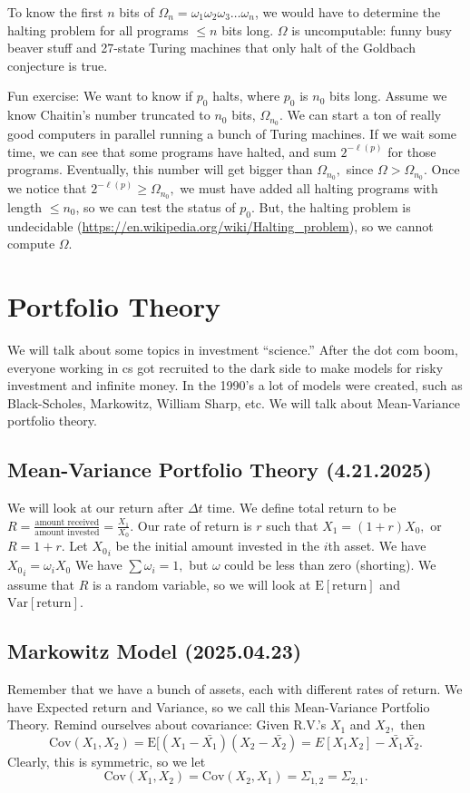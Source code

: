 \documentclass[12pt]{article}
\theoremstyle{remark}
\begin{document}
To know the first $n$ bits of $\Omega_n=\omega_1\omega_2\omega_3\dots\omega_n$, we would have to determine the halting problem for all programs $\le n$ bits long. $\Omega$ is uncomputable: funny busy beaver stuff and 27-state Turing machines that only halt of the Goldbach conjecture is true.

Fun exercise: We want to know if $p_0$ halts, where $p_0$ is $n_0$ bits long. Assume we know Chaitin's number truncated to $n_0$ bits, $\Omega_{n_0}.$ We can start a ton of really good computers in parallel running a bunch of Turing machines. If we wait some time, we can see that some programs have halted, and sum $2^{-\ell(p)}$ for those programs. Eventually, this number will get bigger than $\Omega_{n_0},$ since $\Omega > \Omega_{n_0}$. Once we notice that $2^{-\ell(p)}\ge\Omega_{n_0},$ we must have added all halting programs with length $\le n_0$, so we can test the status of $p_0.$ But, the halting problem is undecidable (\url{https://en.wikipedia.org/wiki/Halting_problem}), so we cannot compute $\Omega.$

\section{Portfolio Theory}
We will talk about some topics in investment ``science.'' After the dot com boom, everyone working in cs got recruited to the dark side to make models for risky investment and infinite money. In the 1990's a lot of models were created, such as Black-Scholes, Markowitz, William Sharp, etc. We will talk about Mean-Variance portfolio theory.
\subsection{Mean-Variance Portfolio Theory (4.21.2025)}
We will look at our return after $\Delta t$ time. We define total return to be $R=\frac{\text{amount received}}{\text{amount invested}}=\frac{X_1}{X_0}.$ Our rate of return is $r$ such that $X_1=(1+r)X_0,$ or $R=1+r.$ Let ${X_0}_i$ be the initial amount invested in the $i$th asset. We have ${X_0}_i=\omega_iX_0$ We have $\sum\omega_i=1,$ but $\omega$ could be less than zero (shorting). We assume that $R$ is a random variable, so we will look at $\mathrm{E}[\mathrm{return}]$ and $\mathrm{Var}[\mathrm{return}].$

\subsection{Markowitz Model (2025.04.23)}
Remember that we have a bunch of assets, each with different rates of return. We have Expected return and Variance, so we call this Mean-Variance Portfolio Theory. Remind ourselves about covariance: Given R.V.'s $X_1$ and $X_2,$ then
\[\mathrm{Cov}(X_1,X_2)=\mathrm{E}[(X_1-\bar{X_1})(X_2-\bar{X_2})=E[X_1X_2]-\bar{X_1}\bar{X_2}.\]
Clearly, this is symmetric, so we let
\[\mathrm{Cov}(X_1,X_2)=\mathrm{Cov}(X_2,X_1)=\Sigma_{1,2}=\Sigma_{2,1}.\]
\end{document}
